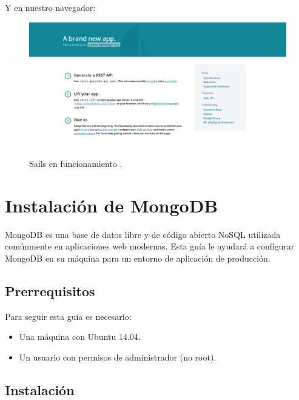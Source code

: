 \begin{appendix}
Y en nuestro navegador:\\

\begin{figure}[H]
  \begin{center}
    \includegraphics[scale=0.3]{imagenes/browser_sails.png}
  \end{center}
  \label{fig:logo}
 \caption{Sails en funcionamiento \protect\footnotemark.}
\end{figure}



\section{Instalación de MongoDB}

MongoDB es una base de datos libre y de código abierto NoSQL utilizada comúnmente en aplicaciones web modernas. Esta guía le ayudará a configurar MongoDB en su máquina para un entorno de aplicación de producción.\\

\subsection{Prerrequisitos}

Para seguir esta guía es necesario:
\begin{itemize}

\item{Una máquina con Ubuntu 14.04.}
\item{Un usuario con permisos de administrador (no root).}
\end{itemize}

\subsection{Instalación}



\end{appendix}
